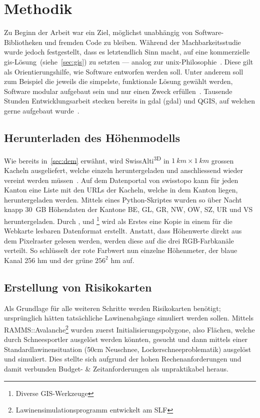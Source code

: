 \vfill

\pagebreak


\section{Methodik}

Zu Beginn der Arbeit war ein Ziel, möglichst unabhängig von Software-Bibliotheken und fremden Code zu bleiben. Während der Machbarkeitsstudie wurde jedoch festgestellt, dass es letztendlich Sinn macht, auf eine kommerzielle \gls{gis}-Lösung~(siehe~\ref{sec:gis}) zu setzten --- analog zur \acrshort{unix}-Philosophie~\cite{unixphil}. Diese gilt als Orientierungshilfe, wie Software entworfen werden soll. Unter anderem soll zum Beispiel die jeweils die simpelste, funktionale Lösung gewählt werden, Software modular aufgebaut sein und nur einen Zweck erfüllen~\cite{unixphil}. Tausende Stunden Entwicklungsarbeit stecken bereits in \acrshort{gdal} (\acrlong{gdal}) und QGIS, auf welchen gerne aufgebaut wurde~\cite{gdalmanual}\cite{qgis}.
\subsection{Herunterladen des Höhenmodells}

Wie bereits in\ \ref{sec:dem} erwähnt, wird SwissAlti\textsuperscript{3D} in $\qty{1}{km} \times \qty{1}{km}$ grossen Kacheln ausgeliefert, welche einzeln heruntergeladen und anschliessend wieder vereint werden müssen~\cite{alti3dprod}. Auf dem Datenportal von swisstopo kann für jeden Kanton eine Liste mit den URLs der Kacheln, welche in dem Kanton liegen, heruntergeladen werden. Mittels eines Python-Skriptes wurden so über Nacht knapp \qty{30}{GB} Höhendaten der Kantone BE, GL, GR, NW, OW, SZ, UR und VS heruntergeladen. Durch ,  und \footnote{Diverse GIS-Werkzeuge} wird als Erstes eine Kopie in einem für die Webkarte lesbaren Datenformat erstellt. Anstatt, dass Höhenwerte direkt aus dem Pixelraster gelesen werden, werden diese auf die drei RGB-Farbkanäle verteilt. So schlüsselt der rote Farbwert nun einzelne Höhenmeter, der blaue Kanal 256 hm und der grüne $256^2$ hm auf.

\subsection{Erstellung von Risikokarten}

Als Grundlage für alle weiteren Schritte werden Risikokarten benötigt; ursprünglich hätten tatsächliche Lawinenabgänge simuliert werden sollen. Mittels RAMMS::Avalanche\footnote{Lawinensimulationsprogramm entwickelt am SLF} wurden zuerst Initialisierungspolygone, also Flächen, welche durch Schneesportler ausgelöst werden könnten, gesucht und dann mittels einer Standardlawinensituation (50cm Neuschnee, Lockerschneeproblematik) ausgelöst und simuliert. Dies stellte sich aufgrund der hohen Rechenanforderungen und damit verbunden Budget- \& Zeitanforderungen als unpraktikabel heraus.

